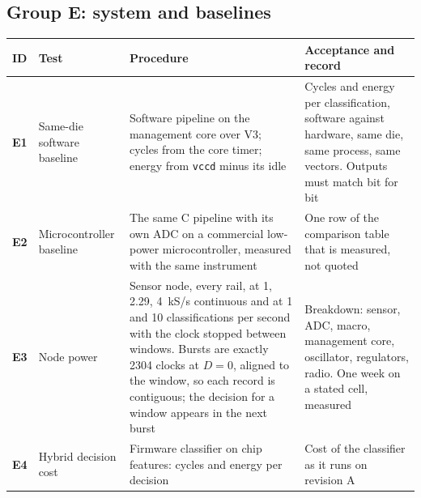 \documentclass[10pt]{article}
\newcommand{\tid}[1]{\textbf{#1}}
\begin{document}
\subsection*{Group E: system and baselines}
{\small
\begin{longtable}{@{}L{0.8cm}L{3.3cm}L{6.6cm}L{4.3cm}@{}}
\toprule
ID & Test & Procedure & Acceptance and record\\
\midrule
\endhead
\tid{E1} & Same-die software baseline & Software pipeline on the management core over V3; cycles from the core timer; energy from \texttt{vccd} minus its idle & Cycles and energy per classification, software against hardware, same die, same process, same vectors. Outputs must match bit for bit\\
\tid{E2} & Microcontroller baseline & The same C pipeline with its own ADC on a commercial low-power microcontroller, measured with the same instrument & One row of the comparison table that is measured, not quoted\\
\tid{E3} & Node power & Sensor node, every rail, at 1, 2.29, 4~kS/s continuous and at 1 and 10 classifications per second with the clock stopped between windows. Bursts are exactly \num{2304} clocks at $D=0$, aligned to the window, so each record is contiguous; the decision for a window appears in the next burst & Breakdown: sensor, ADC, macro, management core, oscillator, regulators, radio. One week on a stated cell, measured\\
\tid{E4} & Hybrid decision cost & Firmware classifier on chip features: cycles and energy per decision & Cost of the classifier as it runs on revision A\\
\bottomrule
\end{longtable}}
\end{document}
